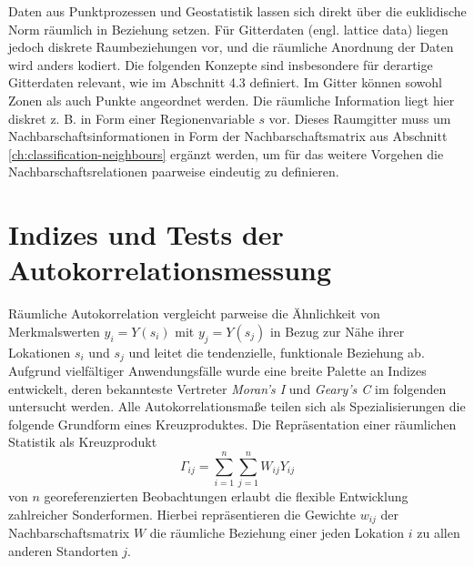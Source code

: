 Daten aus Punktprozessen und Geostatistik lassen sich direkt über die euklidische Norm räumlich in Beziehung setzen. 
Für Gitterdaten (engl. lattice data) liegen jedoch diskrete Raumbeziehungen vor, und die räumliche Anordnung der Daten wird anders kodiert.
Die folgenden Konzepte sind insbesondere für derartige Gitterdaten relevant, wie im Abschnitt 4.3 definiert. 
Im Gitter können sowohl Zonen als auch Punkte angeordnet werden. Die räumliche Information liegt hier diskret z. B. in Form 
einer Regionenvariable $s$ vor. Dieses Raumgitter muss um Nachbarschaftsinformationen in Form 
der Nachbarschaftsmatrix aus Abschnitt \ref{ch:classification-neighbours} ergänzt werden, 
um für das weitere Vorgehen die Nachbarschaftsrelationen paarweise eindeutig zu definieren. 

\section{Indizes und Tests der Autokorrelationsmessung}

Räumliche Autokorrelation vergleicht parweise die Ähnlichkeit von Merkmalswerten $y_i=Y\left(s_i\right)$ mit $y_j=Y\left(s_j\right)$ 
in Bezug zur Nähe ihrer Lokationen $s_i$ und $s_j$ und leitet die tendenzielle, funktionale Beziehung ab. 
Aufgrund vielfältiger Anwendungsfälle wurde eine breite Palette an Indizes entwickelt, 
deren bekannteste Vertreter \emph{Moran’s I} und \emph{Geary’s C} im folgenden untersucht werden. 
Alle Autokorrelationsmaße teilen sich als Spezialisierungen die folgende Grundform eines Kreuzproduktes. 
Die Repräsentation einer räumlichen Statistik als Kreuzprodukt 
\begin{equation}
    \label{eq:gamma}
    \Gamma_{ij} =\sum_{i=1}^n \sum_{j=1}^n W_{ij} Y_{ij}
\end{equation}
von $n$ georeferenzierten Beobachtungen erlaubt die flexible Entwicklung zahlreicher Sonderformen. 
Hierbei repräsentieren die Gewichte $w_{ij}$ der Nachbarschaftsmatrix $W$ die räumliche Beziehung einer jeden Lokation $i$ zu allen anderen Standorten $j$. 
\cite[S. 259]{fischer_handbook_2010}

